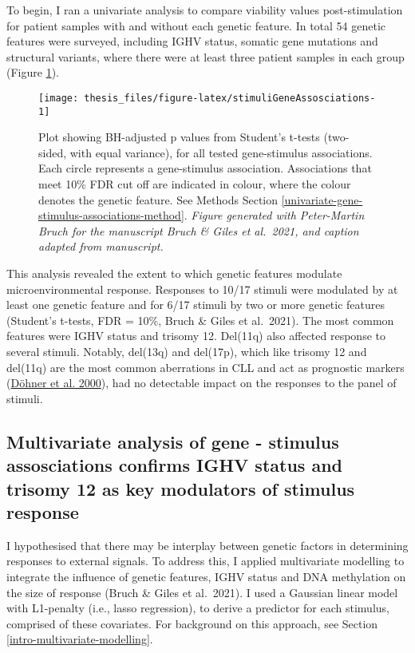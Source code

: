 \documentclass[11pt, a4paper, twosided]{book}
\begin{document}
To begin, I ran a univariate analysis to compare viability values post-stimulation for patient samples with and without each genetic feature. In total 54 genetic features were surveyed, including IGHV status, somatic gene mutations and structural variants, where there were at least three patient samples in each group (Figure \ref{fig:stimuliGeneAssosciations}).


\begin{figure}

{\centering \texttt{[image: thesis\_files/figure-latex/stimuliGeneAssosciations-1]} 

}

\caption{Plot showing BH-adjusted p values from Student's t-tests (two-sided, with equal variance), for all tested gene-stimulus associations. Each circle represents a gene-stimulus association. Associations that meet 10\% FDR cut off are indicated in colour, where the colour denotes the genetic feature. See Methods Section \ref{univariate-gene-stimulus-associations-method}. \emph{Figure generated with Peter-Martin Bruch for the manuscript Bruch \& Giles et al.~2021, and caption adapted from manuscript.}}\label{fig:stimuliGeneAssosciations}
\end{figure}
This analysis revealed the extent to which genetic features modulate microenvironmental response. Responses to 10/17 stimuli were modulated by at least one genetic feature and for 6/17 stimuli by two or more genetic features (Student's t-tests, FDR = 10\%, Bruch \& Giles et al.~2021). The most common features were IGHV status and trisomy 12. Del(11q) also affected response to several stimuli. Notably, del(13q) and del(17p), which like trisomy 12 and del(11q) are the most common aberrations in CLL and act as prognostic markers (\protect\hyperlink{ref-Dohner2000}{Döhner et al. 2000}), had no detectable impact on the responses to the panel of stimuli.

\hypertarget{multivariate-gene-stimulus-assosciations}{%
\subsection{Multivariate analysis of gene - stimulus assosciations confirms IGHV status and trisomy 12 as key modulators of stimulus response}\label{multivariate-gene-stimulus-assosciations}}

I hypothesised that there may be interplay between genetic factors in determining responses to external signals. To address this, I applied multivariate modelling to integrate the influence of genetic features, IGHV status and DNA methylation on the size of response (Bruch \& Giles et al.~2021). I used a Gaussian linear model with L1-penalty (i.e., lasso regression), to derive a predictor for each stimulus, comprised of these covariates. For background on this approach, see Section \ref{intro-multivariate-modelling}.
\end{document}
